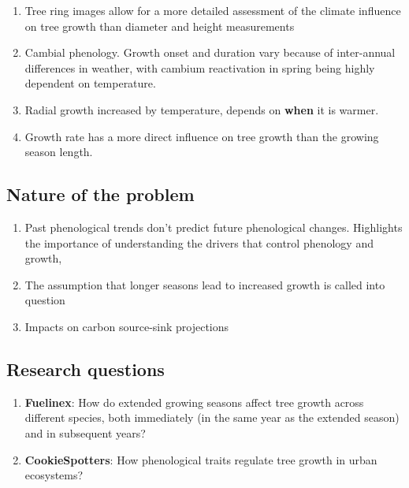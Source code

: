 \documentclass{article}
\begin{document}
\begin{enumerate}
	\item  Tree ring images allow for a more detailed assessment of the climate influence on tree growth than diameter and height measurements 
	\item Cambial phenology. Growth onset and duration vary because of inter-annual differences in weather, with cambium reactivation in spring being highly dependent on temperature. 
	\item Radial growth increased by temperature, depends on \textbf{when} it is warmer. 
	\item Growth rate has a more direct influence on tree growth than the growing season length. 
\end{enumerate}

\subsection*{Nature of the problem} 
\begin{enumerate}
	\item Past phenological trends don't predict future phenological changes. Highlights the importance of understanding the drivers that control phenology and growth,
	\item The assumption that longer seasons lead to increased growth is called into question
	\item Impacts on carbon source-sink projections
\end{enumerate}

\subsection *{Research questions}
\begin {enumerate}
	\item \textbf{Fuelinex}: How do extended growing seasons affect tree growth across different species, both immediately (in the same year as the extended season) and in subsequent years?
	\item \textbf {CookieSpotters}: How phenological traits regulate tree growth in urban ecosystems?
\end {enumerate}
\end{document}
